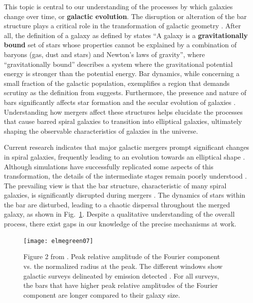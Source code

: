 \documentclass[twocolumn]{aastex631}
\DeclareRobustCommand{\Figref}[1]{Fig.~\ref{#1}}
\begin{document}
This topic is central to our understanding of the processes by which
galaxies change over time, or \textbf{galactic evolution}. The
disruption or alteration of the bar structure plays a critical role in
the transformation of galactic geometry \citep{wu:18}. After all, the
definition of a galaxy as defined by \citet{willman:12} states ``A
galaxy is a \textbf{gravitationally bound} set of stars whose
properties cannot be explained by a combination of baryons (gas, dust
and stars) and Newton’s laws of gravity'', where ``gravitationally
bound'' describes a system where the gravitational potential energy is
stronger than the potential energy. Bar dynamics, while concerning a
small fraction of the galactic population, exemplifies a region that
demands scrutiny as the definition from \citet{willman:12}
suggests. Furthermore, the presence and nature of bars significantly
affects star formation and the secular evolution of galaxies
\citep{schoenrich:17}. Understanding how mergers affect these
structures helps elucidate the processes that cause barred spiral
galaxies to transition into elliptical galaxies, ultimately shaping
the observable characteristics of galaxies in the universe.

Current research indicates that major galactic mergers prompt
significant changes in spiral galaxies, frequently leading to an
evolution towards an elliptical shape
\citep[e.g.,][]{mutch:11}. Although simulations have successfully
replicated some aspects of this transformation, the details of the
intermediate stages remain poorly understood \citep{berentzen:03}. The
prevailing view is that the bar structure, characteristic of many
spiral galaxies, is significantly disrupted during mergers
\citep[e.g.,][]{mihos:96,mutch:11}. The dynamics of stars within the
bar are disturbed, leading to a chaotic dispersal throughout the
merged galaxy, as shown in \Figref{fig:elmegreen}. Despite a
qualitative understanding of the overall process, there exist gaps in
our knowledge of the precise mechanisms at work.

\begin{figure}[htbp]
    \centering
    \texttt{[image: elmegreen07]}
    \caption{Figure 2 from \citet{elmegreen:07}. Peak relative
      amplitude of the Fourier component vs. the normalized radius at
      the peak. The different windows show galactic surveys delineated
      by emission detected \citep[see][]{elmegreen:07}. For all
      surveys, the bars that have higher peak relative amplitudes of
      the Fourier component are longer compared to their galaxy size.}
    \label{fig:elmegreen}
\end{figure}
\end{document}
